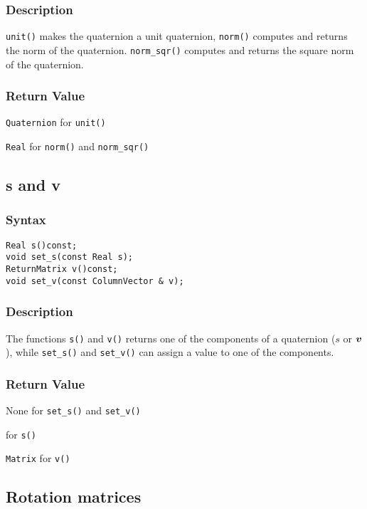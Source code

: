 \documentclass[11pt,fleqn,letterpaper]{report}
\newcommand{\mbold}[1]{\mbox{\boldmath $ #1 $}}
\begin{document}
\subsubsection{Description}
\texttt{unit()} makes the quaternion a unit quaternion,
\texttt{norm()} computes and returns the norm of the quaternion.
\texttt{norm\_sqr()} computes and returns the square norm of the quaternion.

\subsubsection*{Return Value}

{\tt Quaternion} for \texttt{unit()}

\noindent \texttt{Real} for \texttt{norm()} and \texttt{norm\_sqr()}

\newpage

\subsection*{s and v}

\subsubsection*{Syntax}
\begin{verbatim}
Real s()const;
void set_s(const Real s);
ReturnMatrix v()const;
void set_v(const ColumnVector & v);
\end{verbatim}
\subsubsection{Description}
The functions \texttt{s()} and \texttt{v()} returns one of the
components of a quaternion ($s$ or $\mbold{v}$), while
\texttt{set\_s()} and \texttt{set\_v()} can assign a value to one of
the components.

\subsubsection*{Return Value}

None for \texttt{set\_s()} and \texttt{set\_v()}

 for \texttt{s()}

\noindent \texttt{Matrix} for \texttt{v()}

\newpage

\subsection*{Rotation matrices}
\end{document}
